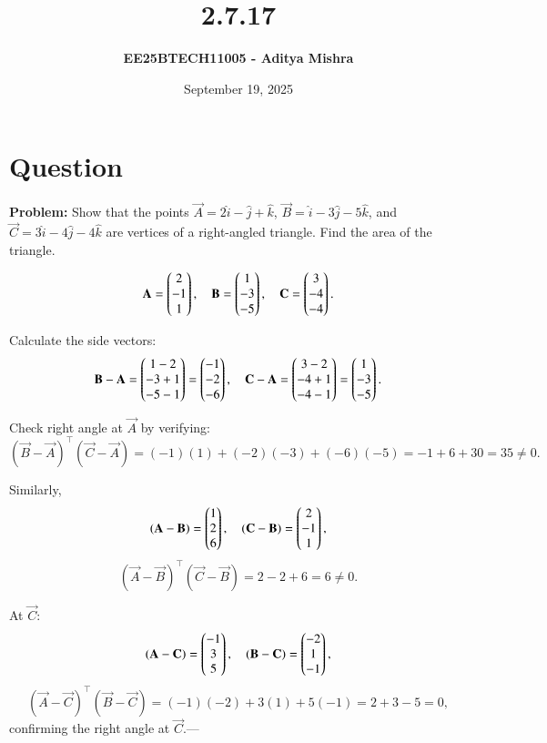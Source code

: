 \documentclass[12pt]{article}
\title{\textbf{2.7.17}}
\author{\textbf{EE25BTECH11005 - Aditya Mishra}}
\date{September 19, 2025}
\begin{document}
\maketitle
\section*{Question}
\textbf{Problem:} Show that the points \(\vec{A} = 2\hat{i} - \hat{j} + \hat{k}\), \(\vec{B} = \hat{i} - 3\hat{j} - 5\hat{k}\), and \(\vec{C} = 3\hat{i} - 4\hat{j} - 4\hat{k}\) are vertices of a right-angled triangle. Find the area of the triangle.


\[
\mathbf{A} = \begin{pmatrix}2 \\ -1 \\ 1\end{pmatrix}, \quad \mathbf{B} = \begin{pmatrix}1 \\ -3 \\ -5\end{pmatrix}, \quad \mathbf{C} = \begin{pmatrix}3 \\ -4 \\ -4\end{pmatrix}.
\]

Calculate the side vectors:
\[
\mathbf{B} - \mathbf{A} = \begin{pmatrix}1 - 2 \\ -3 + 1 \\ -5 - 1\end{pmatrix} = \begin{pmatrix}-1 \\ -2 \\ -6\end{pmatrix}, \quad
\mathbf{C} - \mathbf{A} = \begin{pmatrix}3 - 2 \\ -4 + 1 \\ -4 - 1\end{pmatrix} = \begin{pmatrix}1 \\ -3 \\ -5\end{pmatrix}.
\]

Check right angle at \(\vec{A}\) by verifying:
\[
(\vec{B} - \vec{A})^\top (\vec{C} - \vec{A}) = (-1)(1) + (-2)(-3) + (-6)(-5) = -1 + 6 + 30 = 35 \neq 0.
\]

Similarly,
\[
(\mathbf{A} - \mathbf{B}) = \begin{pmatrix}1 \\ 2 \\ 6\end{pmatrix}, \quad
(\mathbf{C} - \mathbf{B}) = \begin{pmatrix}2 \\ -1 \\ 1\end{pmatrix},
\]
\[
(\vec{A} - \vec{B})^\top (\vec{C} - \vec{B}) = 2 - 2 + 6 = 6 \neq 0.
\]

At \(\vec{C}\):
\[
(\mathbf{A} - \mathbf{C}) = \begin{pmatrix}-1 \\ 3 \\ 5\end{pmatrix}, \quad
(\mathbf{B} - \mathbf{C}) = \begin{pmatrix}-2 \\ 1 \\ -1\end{pmatrix},
\]
\[
(\vec{A} - \vec{C})^\top (\vec{B} - \vec{C}) = (-1)(-2) + 3(1) + 5(-1) = 2 + 3 -5 = 0,
\]
confirming the right angle at \(\vec{C}\).---
\end{document}
